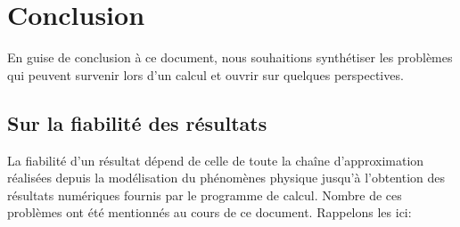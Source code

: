 \chapter*{Conclusion}\label{Ch-Ccl}

En guise de conclusion à ce document, nous souhaitions synthétiser les problèmes qui peuvent survenir lors d'un calcul et ouvrir sur quelques perspectives.


\medskip
\section*{Sur la fiabilité des résultats}

La fiabilité d'un résultat dépend de celle de toute la chaîne d'approximation réalisées depuis la modélisation du phénomènes physique jusqu'à l'obtention des résultats numériques fournis par le programme de calcul. Nombre de ces problèmes ont été mentionnés au cours de ce document. Rappelons les ici:
